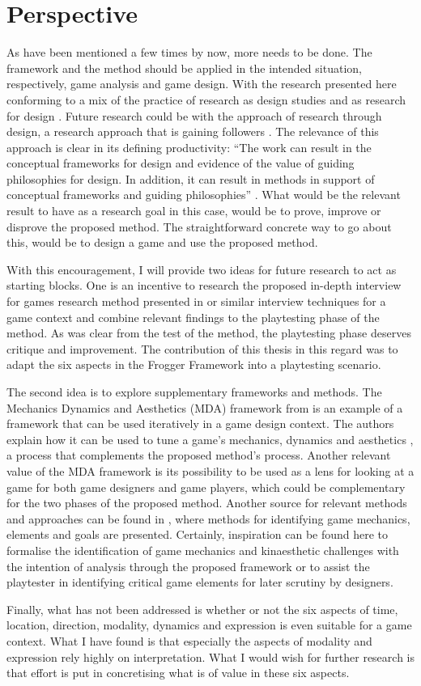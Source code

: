 \section{Perspective}
As have been mentioned a few times by now, more needs to be done. The framework and the method should be applied in the intended situation, respectively, game analysis and game design. With the research presented here conforming to a mix of the practice of research as design studies \cite{rigour} and as research for design \cite{designtotheory}. Future research could be with the approach of research through design, a research approach that is gaining followers \cite{rthroughd, designtotheory}. The relevance of this approach is clear in its defining productivity: ``The work can result in the conceptual frameworks for design and evidence of the value of guiding philosophies for design. In addition, it can result in methods in support of conceptual frameworks and guiding philosophies'' \cite[p. 2894]{designtotheory}. What would be the relevant result to have as a research goal in this case, would be to prove, improve or disprove the proposed method. The straightforward concrete way to go about this, would be to design a game and use the proposed method.

With this encouragement, I will provide two ideas for future research to act as starting blocks. One is an incentive to research the proposed in-depth interview for games research method presented in  or similar interview techniques for a game context and combine relevant findings to the playtesting phase of the method. As was clear from the test of the method, the playtesting phase deserves critique and improvement. The contribution of this thesis in this regard was to adapt the six aspects in the Frogger Framework into a playtesting scenario.

The second idea is to explore supplementary frameworks and methods. The Mechanics Dynamics and Aesthetics (MDA) framework from  is an example of a framework that can be used iteratively in a game design context. The authors explain how it can be used to tune a game's mechanics, dynamics and aesthetics \cite{mda}, a process that complements the proposed method's process. Another relevant value of the MDA framework is its possibility to be used as a lens for looking at a game for both game designers and game players, which could be complementary for the two phases of the proposed method. Another source for relevant methods and approaches can be found in , where methods for identifying game mechanics, elements and goals are presented. Certainly, inspiration can be found here to formalise the identification of game mechanics and kinaesthetic challenges with the intention of analysis through the proposed framework or to assist the playtester in identifying critical game elements for later scrutiny by designers.

Finally, what has not been addressed is whether or not the six aspects of time, location, direction, modality, dynamics and expression is even suitable for a game context. What I have found is that especially the aspects of modality and expression rely highly on interpretation. What I would wish for further research is that effort is put in concretising what is of value in these six aspects.
